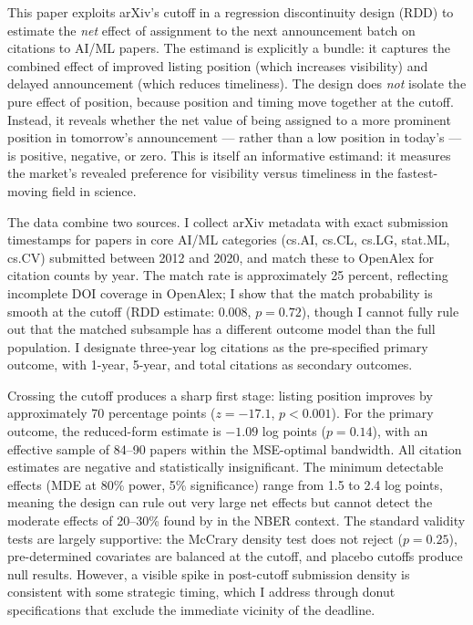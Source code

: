 \documentclass[12pt]{article}
\begin{document}
This paper exploits arXiv's cutoff in a regression discontinuity design (RDD) to estimate the \textit{net} effect of assignment to the next announcement batch on citations to AI/ML papers. The estimand is explicitly a bundle: it captures the combined effect of improved listing position (which increases visibility) and delayed announcement (which reduces timeliness). The design does \textit{not} isolate the pure effect of position, because position and timing move together at the cutoff. Instead, it reveals whether the net value of being assigned to a more prominent position in tomorrow's announcement --- rather than a low position in today's --- is positive, negative, or zero. This is itself an informative estimand: it measures the market's revealed preference for visibility versus timeliness in the fastest-moving field in science.

The data combine two sources. I collect arXiv metadata with exact submission timestamps for papers in core AI/ML categories (cs.AI, cs.CL, cs.LG, stat.ML, cs.CV) submitted between 2012 and 2020, and match these to OpenAlex \citep{priem2022} for citation counts by year. The match rate is approximately 25 percent, reflecting incomplete DOI coverage in OpenAlex; I show that the match probability is smooth at the cutoff (RDD estimate: 0.008, $p = 0.72$), though I cannot fully rule out that the matched subsample has a different outcome model than the full population. I designate three-year log citations as the pre-specified primary outcome, with 1-year, 5-year, and total citations as secondary outcomes.

Crossing the cutoff produces a sharp first stage: listing position improves by approximately 70 percentage points ($z = -17.1$, $p < 0.001$). For the primary outcome, the reduced-form estimate is $-1.09$ log points ($p = 0.14$), with an effective sample of 84--90 papers within the MSE-optimal bandwidth. All citation estimates are negative and statistically insignificant. The minimum detectable effects (MDE at 80\% power, 5\% significance) range from 1.5 to 2.4 log points, meaning the design can rule out very large net effects but cannot detect the moderate effects of 20--30\% found by \citet{feenberg2017} in the NBER context. The standard validity tests are largely supportive: the McCrary density test does not reject ($p = 0.25$), pre-determined covariates are balanced at the cutoff, and placebo cutoffs produce null results. However, a visible spike in post-cutoff submission density is consistent with some strategic timing, which I address through donut specifications that exclude the immediate vicinity of the deadline.
\end{document}
